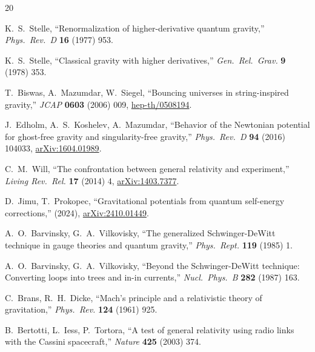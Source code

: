 \documentclass[11pt,a4paper]{article}
\theoremstyle{plain}
\theoremstyle{definition}
\theoremstyle{remark}
\begin{document}
\begin{thebibliography}{20}

K.~S.~Stelle,
``Renormalization of higher-derivative quantum gravity,''
\textit{Phys.\ Rev.\ D} \textbf{16} (1977) 953.

K.~S.~Stelle,
``Classical gravity with higher derivatives,''
\textit{Gen.\ Rel.\ Grav.} \textbf{9} (1978) 353.

T.~Biswas, A.~Mazumdar, W.~Siegel,
``Bouncing universes in string-inspired gravity,''
\textit{JCAP} \textbf{0603} (2006) 009,
\href{https://arxiv.org/abs/hep-th/0508194}{hep-th/0508194}.

J.~Edholm, A.~S.~Koshelev, A.~Mazumdar,
``Behavior of the Newtonian potential for ghost-free gravity
and singularity-free gravity,''
\textit{Phys.\ Rev.\ D} \textbf{94} (2016) 104033,
\href{https://arxiv.org/abs/1604.01989}{arXiv:1604.01989}.

C.~M.~Will,
``The confrontation between general relativity and experiment,''
\textit{Living Rev.\ Rel.} \textbf{17} (2014) 4,
\href{https://arxiv.org/abs/1403.7377}{arXiv:1403.7377}.

D.~Jimu, T.~Prokopec,
``Gravitational potentials from quantum self-energy corrections,''
(2024),
\href{https://arxiv.org/abs/2410.01449}{arXiv:2410.01449}.

A.~O.~Barvinsky, G.~A.~Vilkovisky,
``The generalized Schwinger-DeWitt technique in gauge theories
and quantum gravity,''
\textit{Phys.\ Rept.} \textbf{119} (1985) 1.

A.~O.~Barvinsky, G.~A.~Vilkovisky,
``Beyond the Schwinger-DeWitt technique: Converting loops into trees
and in-in currents,''
\textit{Nucl.\ Phys.\ B} \textbf{282} (1987) 163.

C.~Brans, R.~H.~Dicke,
``Mach's principle and a relativistic theory of gravitation,''
\textit{Phys.\ Rev.} \textbf{124} (1961) 925.

B.~Bertotti, L.~Iess, P.~Tortora,
``A test of general relativity using radio links with the Cassini
spacecraft,''
\textit{Nature} \textbf{425} (2003) 374.

\end{thebibliography}
\end{document}
